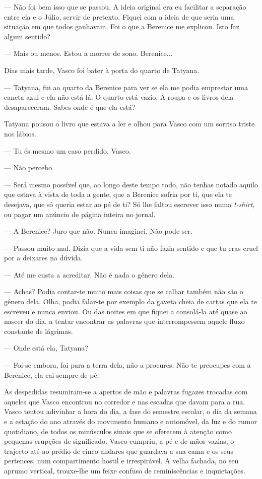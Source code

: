 --- Não foi bem isso que se passou. A ideia original era eu facilitar a
  separação entre ela e o Júlio, servir de pretexto. Fiquei com a ideia
  de que seria uma situação em que todos ganhavam. Foi o que a Berenice
  me explicou. Isto faz algum sentido?

--- Mais ou menos. Estou a morrer de sono. Berenice...


Dias mais tarde, Vasco foi bater à porta do quarto de Tatyana.

--- Tatyana, fui ao quarto da Berenice para ver se ela me podia emprestar
  uma caneta azul e ela não está lá. O quarto está vazio. A roupa e os
  livros dela desapareceram. Sabes onde é que ela está?


Tatyana pousou o livro que estava a ler e olhou para Vasco com um
sorriso triste nos lábios.

--- Tu és mesmo um caso perdido, Vasco.

--- Não percebo.

--- Será mesmo possível que, ao longo deste tempo todo, não tenhas notado
  aquilo que estava à vista de toda a gente, que a Berenice sofria por
  ti, que ela te desejava, que só queria estar ao pé de ti? Só lhe
  faltou escrever isso numa \emph{t-shirt, }ou pagar um anúncio de
  página inteira no jornal.

--- A Berenice? Juro que não. Nunca imaginei. Não pode ser.

--- Passou muito mal. Dizia que a vida sem ti não fazia
sentido e que tu eras cruel por a deixares na dúvida.

--- Até me custa a acreditar. Não é nada o género dela.

--- Achas? Podia contar-te muito mais coisas que se calhar
também não são o género dela. Olha, podia falar-te por exemplo
da gaveta cheia de cartas que ela te escreveu e nunca enviou. Ou das
noites em que fiquei a consolá-la até quase ao nascer do dia, a tentar
encontrar as palavras que interrompessem aquele fluxo constante de
lágrimas.

--- Onde está ela, Tatyana?

--- Foi-se embora, foi para a terra dela, não a procures.
Não te preocupes com a Berenice, ela cai sempre de pé.

As despedidas resumiram-se a apertos de mão e palavras fugazes trocadas
com aqueles que Vasco encontrou no corredor e nas escadas que davam para
a rua. Vasco tentou adivinhar a hora do dia, a fase do semestre escolar,
o dia da semana e a estação do ano através do movimento humano e
automóvel, da luz e do rumor quotidiano, de todos os minúsculos sinais
que se oferecem à atenção como pequenas erupções de significado. Vasco
cumpriu, a pé e de mãos vazias, o trajecto até ao prédio de cinco
andares que guardava a sua cama e os seus pertences, num compartimento
hostil e irrespirável. A velha fachada, no seu aprumo vertical,
trouxe-lhe um feixe confuso de reminiscências e inquietações.

